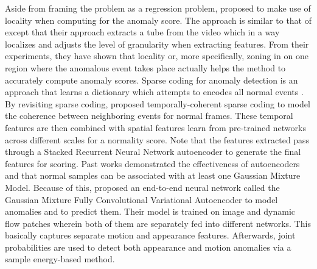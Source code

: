 Aside from framing the problem as a regression problem,  proposed to make use of locality when computing for the anomaly score. The approach is similar to that of  except that their approach extracts a tube from the video which in a way localizes and adjusts the level of granularity when extracting features. From their experiments, they have shown that locality or, more specifically, zoning in on one region where the anomalous event takes place actually helps the method to accurately compute anomaly scores. 
Sparse coding for anomaly detection is an approach that learns a dictionary which attempts to encodes all normal events . By revisiting sparse coding,  proposed temporally-coherent sparse coding to model the coherence between neighboring events for normal frames. These temporal features are then combined with spatial features learn from pre-trained networks across different scales for a normality score. Note that the features extracted pass through a Stacked Recurrent Neural Network autoencoder to generate the final features for scoring.
Past works demonstrated the effectiveness of autoencoders and that normal samples can be associated with at least one Gaussian Mixture Model. Because of this,  proposed an end-to-end neural network called the Gaussian Mixture Fully Convolutional Variational Autoencoder to model anomalies and to predict them. Their model is trained on image and dynamic flow patches wherein both of them are separately fed into different networks. This basically captures separate motion and appearance features. Afterwards, joint probabilities are used to detect both appearance and motion anomalies via a sample energy-based method.

